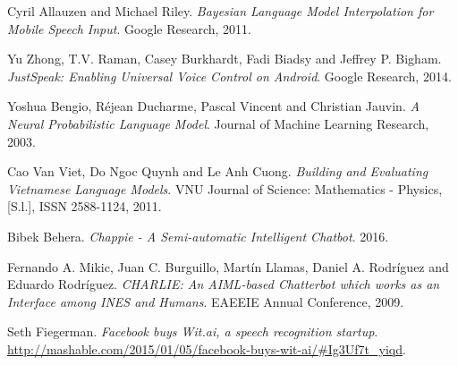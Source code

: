 \documentclass[12pt]{report}
\begin{document}
\begin{flushleft}
\begin{thebibliography}{9}
Cyril Allauzen and Michael Riley. 
\textit{Bayesian Language Model Interpolation for Mobile Speech Input}. 
Google Research, 2011.

Yu Zhong, T.V. Raman, Casey Burkhardt, Fadi Biadsy and Jeffrey P. Bigham. 
\textit{JustSpeak: Enabling Universal Voice Control on Android}. 
Google Research, 2014.

Yoshua Bengio, Réjean Ducharme, Pascal Vincent and Christian Jauvin. 
\textit{A Neural Probabilistic Language Model}. 
Journal of Machine Learning Research, 2003.

Cao Van Viet, Do Ngoc Quynh and Le Anh Cuong. 
\textit{Building and Evaluating Vietnamese Language Models}. 
VNU Journal of Science: Mathematics - Physics, [S.l.], ISSN 2588-1124, 2011.

Bibek Behera. 
\textit{Chappie - A Semi-automatic Intelligent Chatbot}. 
2016.

Fernando A. Mikic, Juan C. Burguillo, Martín Llamas, Daniel A. Rodríguez and Eduardo Rodríguez. 
\textit{CHARLIE: An AIML-based Chatterbot which works as an Interface among INES and Humans}. 
EAEEIE Annual Conference, 2009.

Seth Fiegerman. 
\textit{Facebook buys Wit.ai, a speech recognition startup}.
\url{http://mashable.com/2015/01/05/facebook-buys-wit-ai/#Ig3Uf7t_yiqd}.

\end{thebibliography}

\end{flushleft}

\end{document}
